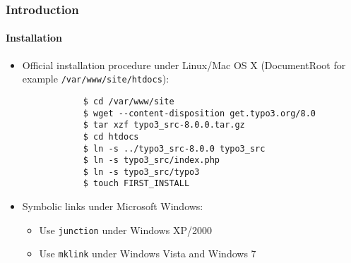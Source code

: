 \begin{frame}[fragile]
	\frametitle{Introduction}
	\framesubtitle{Installation}

	\begin{itemize}
		\item Official installation procedure under Linux/Mac OS X\newline
			(DocumentRoot for example \texttt{/var/www/site/htdocs}):
		\begin{lstlisting}
			$ cd /var/www/site
			$ wget --content-disposition get.typo3.org/8.0
			$ tar xzf typo3_src-8.0.0.tar.gz
			$ cd htdocs
			$ ln -s ../typo3_src-8.0.0 typo3_src
			$ ln -s typo3_src/index.php
			$ ln -s typo3_src/typo3
			$ touch FIRST_INSTALL
		\end{lstlisting}

		\item Symbolic links under Microsoft Windows:

			\begin{itemize}
				\item Use \texttt{junction} under Windows XP/2000
				\item Use \texttt{mklink} under Windows Vista and Windows 7
			\end{itemize}

	\end{itemize}
\end{frame}

